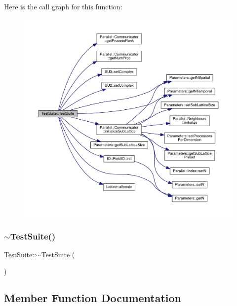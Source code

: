 Here is the call graph for this function\+:
\nopagebreak
\begin{figure}[H]
\begin{center}
\leavevmode
\includegraphics[width=350pt]{class_test_suite_af7291e6d8b53443604ee0c1fcf1fadfc_cgraph}
\end{center}
\end{figure}
\mbox{\label{class_test_suite_a1a4603e985169c62d251876dd3910b5e}} 
\subsubsection{\texorpdfstring{$\sim$TestSuite()}{~TestSuite()}}
{\footnotesize\ttfamily Test\+Suite\+::$\sim$\+Test\+Suite (\begin{DoxyParamCaption}{ }\end{DoxyParamCaption})}



\subsection{Member Function Documentation}
\mbox{\label{class_test_suite_acf6d1ad1920132a4aed74457bb2df8cb}} 
